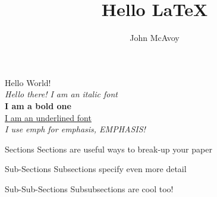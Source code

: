 \documentclass{article}
\title{Hello {\LaTeX}}
\author{John McAvoy}
\begin{document}
\maketitle
\tableofcontents

Hello World!\\

\textit{Hello there! I am an italic font}\\
\textbf{I am a bold one}\\
\underline{I am an underlined font}\\
\emph{I use emph for emphasis, EMPHASIS!}\\

\begin{section}{Sections}
  Sections are useful ways to break-up your paper

  \begin{subsection}{Sub-Sections}
    Subsections specify even more detail

    \begin{subsubsection}{Sub-Sub-Sections}
      Subsubsections are cool too!
    \end{subsubsection}

  \end{subsection}

\end{section}
\end{document}
